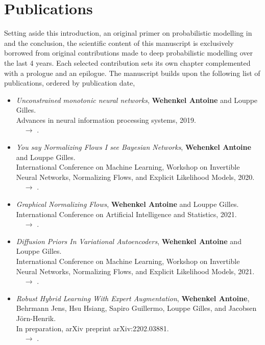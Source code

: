 \section{Publications}
Setting aside this introduction, an original primer on probabilistic modelling in  and the conclusion,
the scientific content of this manuscript is exclusively borrowed from original contributions made to deep probabilistic modelling over the last 4 years.
Each selected contribution sets its own chapter complemented with a prologue and an epilogue.
The manuscript builds upon the following list of publications, ordered by publication date,
  \begin{itemize}
  \item[] \citep{wehenkel_unconstrained_2019} \textit{Unconstrained monotonic neural networks},
  \textbf{Wehenkel Antoine} and Louppe Gilles.\\
  Advances in neural information processing systems, 2019.\\
  $\quad \rightarrow$ .

  \item[] \citep{wehenkel_you_2020} \textit{You say Normalizing Flows I see Bayesian Networks},
  \textbf{Wehenkel Antoine} and Louppe Gilles.\\
  International Conference on Machine Learning, Workshop on Invertible Neural Networks, Normalizing Flows, and Explicit Likelihood Models, 2020.\\
  $\quad \rightarrow$ .

  \item[] \citep{wehenkel2021graphical} \textit{Graphical Normalizing Flows},
  \textbf{Wehenkel Antoine} and Louppe Gilles.\\
  International Conference on Artificial Intelligence and Statistics, 2021.\\
  $\quad \rightarrow$ .

  \item[] \citep{wehenkel2021diffusion} \textit{Diffusion Priors In Variational Autoencoders},
  \textbf{Wehenkel Antoine} and Louppe Gilles.\\
  International Conference on Machine Learning, Workshop on Invertible Neural Networks, Normalizing Flows, and Explicit Likelihood Models, 2021.\\
  $\quad \rightarrow$ .

  \item[] \citep{wehenkel2022robust} \textit{Robust Hybrid Learning With Expert Augmentation},
  \textbf{Wehenkel Antoine}, Behrmann Jens, Hsu Hsiang, Sapiro Guillermo, Louppe Gilles, and Jacobsen J{\"o}rn-Henrik.\\
  In preparation, arXiv preprint arXiv:2202.03881.\\
  $\quad \rightarrow$ .

  \end{itemize}

